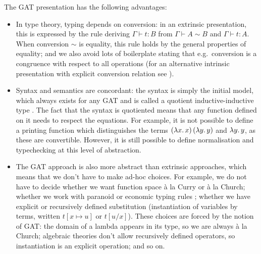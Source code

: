 \documentclass[submission,copyright,creativecommons]{eptcs}
\begin{document}
The GAT presentation has the following advantages:
\begin{itemize}
\item In type theory, typing depends on conversion: in an extrinsic
  presentation, this is expressed by the rule deriving $\Gamma\vdash t
  : B$ from $\Gamma\vdash A \sim B$ and $\Gamma\vdash t : A$.  When
  conversion $\sim$ is equality, this rule holds by the general
  properties of equality; and we also avoid lots of boilerplate
  stating that e.g.\ conversion is a congruence with respect to all
  operations (for an alternative intrinsic presentation with explicit conversion
  relation see \cite{chapman09eatitself}).
\item Syntax and semantics are concordant: the syntax is simply the
  initial model, which always exists for any GAT and is called a
  quotient inductive-inductive type
  \cite{DBLP:journals/pacmpl/KaposiKA19}. The fact that the syntax is
  quotiented means that any function defined on it needs to respect
  the equations. For example, it is not possible to define a printing
  function which distinguishes the terms $(\lambda x\ldotp x)\,(\lambda y\ldotp y)$ and $\lambda y\ldotp y$,
  as these are convertible. However, it is still possible to define
  normalisation \cite{lmcs:4005} and typechecking \cite{typecheck} at
  this level of abstraction.
\item The GAT approach is also more abstract than extrinsic
  approaches, which means that we don't have to make ad-hoc
  choices. For example, we do not have to decide whether we want
  function space {\`a} la Curry or {\`a} la Church; whether we work
  with paranoid or economic typing rules \cite[Section
    5]{winterhalter:hal-01626651}; whether we have explicit or
  recursively defined substitution (instantiation of variables by
  terms, written $t[x\mapsto u]$ or $t[u/x]$).  These choices are
  forced by the notion of GAT: the domain of a lambda appears in its
  type, so we are always {\`a} la Church; algebraic theories don't
  allow recursively defined operators, so instantiation is an explicit
  operation; and so on.
\end{itemize}

\end{document}
